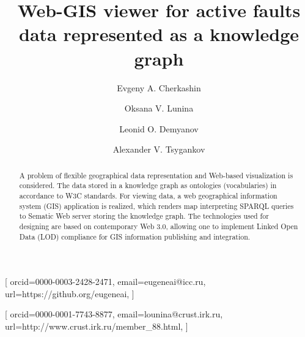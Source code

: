 \documentclass[
]{ceurart}
\begin{document}


\title{Web-GIS viewer for active faults data represented as a knowledge graph}

\author[1,3,4]{Evgeny A. Cherkashin}[%
orcid=0000-0003-2428-2471,
email=eugeneai@icc.ru,
url=https://github.org/eugeneai,
]
\address[1]{Matrosov Institute for System Dynamics and Control Theory of Siberian Branch of Russian Academy of Sciences, 134 Lermontov St, Irkutsk, 664033, Russian Federation}

\author[2]{Oksana V. Lunina}[%
orcid=0000-0001-7743-8877,
email=lounina@crust.irk.ru,
url=http://www.crust.irk.ru/member_88.html,
]

\address[2]{Institute of the Earth’s Crust of Siberian Branch of Russian Academy of Sciences, 128 Lermontov St, Irkutsk, 664033, Russian Federation}

\author[3]{Leonid O. Demyanov}

\address[3]{Institute for Mathematics and Informational Technologies, Irkutsk State University, 20~Gagarina Bulv, Irkutsk, 664003, Russian Federation}

\author[4]{Alexander V. Tsygankov}

\address[4]{Institute for Information Technologies and Data Analysis, National Research Irkutsk State Technical University, 83~Lermontov St, Irkutsk, 664074, Russian Federation}

\begin{abstract}
  A problem of flexible geographical data representation and Web-based visualization is considered.  The data stored in a knowledge graph as ontologies (vocabularies) in accordance to W3C standards.  For viewing data, a web geographical information system (GIS) application is realized, which renders map interpreting SPARQL queries to Sematic Web server storing the knowledge graph.  The technologies used for designing are based on contemporary Web 3.0, allowing one to implement Linked Open Data (LOD) compliance for GIS information publishing and integration.
\end{abstract}
\end{document}
